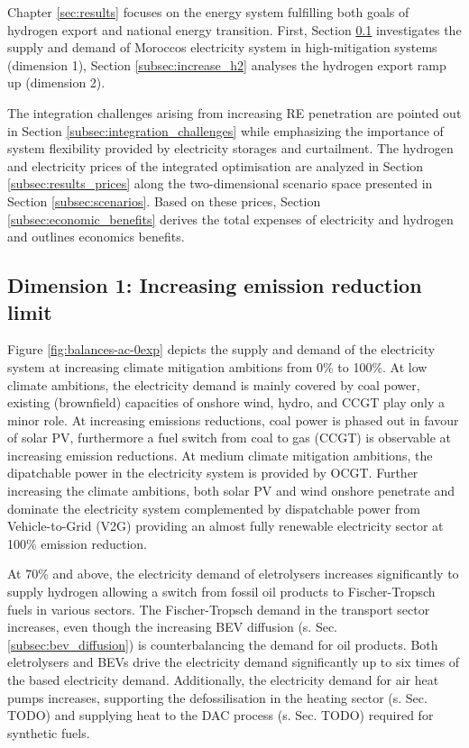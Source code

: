 Chapter \ref{sec:results} focuses on the energy system fulfilling both goals of hydrogen export and national energy transition. First, Section \ref{subsec:increase_limit} investigates the supply and demand of Moroccos electricity system in high-mitigation systems (dimension 1), Section \ref{subsec:increase_h2} analyses the hydrogen export ramp up (dimension 2).

The integration challenges arising from increasing RE penetration are pointed out in Section \ref{subsec:integration_challenges} while emphasizing the importance of system flexibility provided by electricity storages and curtailment. The hydrogen and electricity prices of the integrated optimisation are analyzed in Section \ref{subsec:results_prices} along the two-dimensional scenario space presented in Section \ref{subsec:scenarios}. Based on these prices, Section \ref{subsec:economic_benefits} derives the total expenses of electricity and hydrogen and outlines economics benefits. 

\label{subsec:supply}
\label{subsec:integration_challenges}
\label{subsec:results_prices}
\label{subsec:economic_benefits}
\label{subsec:sensitivity}

\subsection{Dimension 1: Increasing emission reduction limit}
\label{subsec:increase_limit}
Figure \ref{fig:balances-ac-0exp} depicts the supply and demand of the electricity system at increasing climate mitigation ambitions from 0\% to 100\%. At low climate ambitions, the electricity demand is mainly covered by coal power, existing (brownfield) capacities of onshore wind, hydro, and CCGT play only a minor role. 
At increasing emissions reductions, coal power is phased out in favour of solar PV, furthermore a fuel switch from coal to gas (CCGT) is observable at increasing emission reductions. At medium climate mitigation ambitions, the dipatchable power in the electricity system is provided by OCGT. 
Further increasing the climate ambitions, both solar PV and wind onshore penetrate and dominate the electricity system complemented by dispatchable power from Vehicle-to-Grid (V2G) providing an almost fully renewable electricity sector at 100\% emission reduction. 

At 70\% and above, the electricity demand of eletrolysers increases significantly to supply hydrogen allowing a switch from fossil oil products to Fischer-Tropsch fuels in various sectors. The Fischer-Tropsch demand in the transport sector increases, even though the increasing BEV diffusion (s. Sec. \ref{subsec:bev_diffusion}) is counterbalancing the demand for oil products. 
Both eletrolysers and BEVs drive the electricity demand significantly up to six times of the based electricity demand. 
Additionally, the electricity demand for air heat pumps increases, supporting the defossilisation in the heating sector (s. Sec. TODO) and supplying heat to the DAC process (s. Sec. TODO) required for synthetic fuels.


